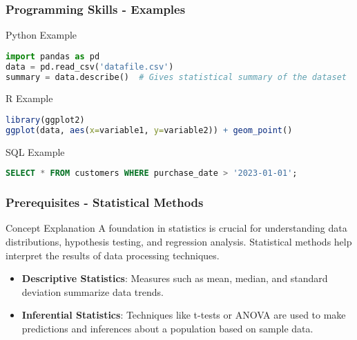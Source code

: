 \documentclass[aspectratio=169]{beamer}
\begin{document}
\begin{frame}[fragile]
    \frametitle{Programming Skills - Examples}
    
    \begin{block}{Python Example}
    \begin{lstlisting}[language=Python]
import pandas as pd
data = pd.read_csv('datafile.csv')
summary = data.describe()  # Gives statistical summary of the dataset
    \end{lstlisting}
    \end{block}

    \begin{block}{R Example}
    \begin{lstlisting}[language=R]
library(ggplot2)
ggplot(data, aes(x=variable1, y=variable2)) + geom_point()
    \end{lstlisting}
    \end{block}

    \begin{block}{SQL Example}
    \begin{lstlisting}[language=SQL]
SELECT * FROM customers WHERE purchase_date > '2023-01-01';
    \end{lstlisting}
    \end{block}
\end{frame}

\begin{frame}
    \frametitle{Prerequisites - Statistical Methods}
    
    \begin{block}{Concept Explanation}
        A foundation in statistics is crucial for understanding data distributions, hypothesis testing, and regression analysis. Statistical methods help interpret the results of data processing techniques.
    \end{block}

    \begin{itemize}
        \item \textbf{Descriptive Statistics}: Measures such as mean, median, and standard deviation summarize data trends.
        \item \textbf{Inferential Statistics}: Techniques like t-tests or ANOVA are used to make predictions and inferences about a population based on sample data.
    \end{itemize}
\end{frame}
\end{document}
